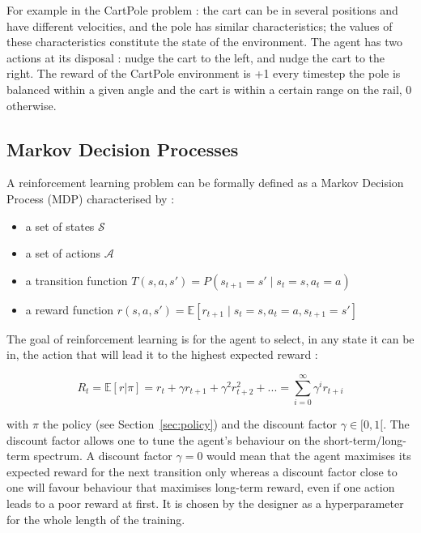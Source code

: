 For example in the CartPole problem : the cart can be in several 
positions and have different velocities, and the pole has similar 
characteristics; the values of these characteristics constitute the state
of the environment. The agent has two actions at its disposal : nudge
the cart to the left, and nudge the cart to the right. 
The reward of the CartPole environment is +1 every timestep the pole is balanced
within a given angle 
and the cart is within a certain range on the rail, 0 otherwise.



\subsection{Markov Decision Processes}
A reinforcement learning problem can be formally defined as a Markov 
Decision Process (MDP)  characterised by :
\begin{itemize}
	\item a set of states $\mathcal{S}$
	\item a set of actions $\mathcal{A}$
	\item a transition function 
		$T(s, a, s') = P(s_{t+1} = s' \mid s_t = s, a_t = a)$
	\item a reward function 
		$r(s, a, s') = \mathbb{E}
		 [r_{t+1} \mid s_t = s, a_t = a, s_{t+1} = s']$
\end{itemize}

The goal of reinforcement learning is for the agent to select, in any state it
can be in, the action that will lead it to the highest expected reward :

\begin{equation}
\label{eq:discounted_reward}
R_t = \mathbb{E}[r|\pi] = r_t + \gamma r_{t+1} + \gamma^2 r_{t+2}^2 + ... =
 \sum\limits_{i=0}^\infty \gamma^i r_{t+i}
\end{equation}

\noindent with $\pi$ the policy (see Section~\ref{sec:policy}) and 
the discount factor  $\gamma \in [0, 1[$.
The discount factor allows one to tune the agent's behaviour on the
short-term/long-term spectrum. A discount factor $\gamma=0$ would mean that the
agent maximises its expected reward for the next transition only whereas a
discount factor close to one will favour behaviour that maximises long-term
reward, even if one action leads to a poor reward at first. It is chosen
by the designer as a hyperparameter for the whole length of the training.\\

